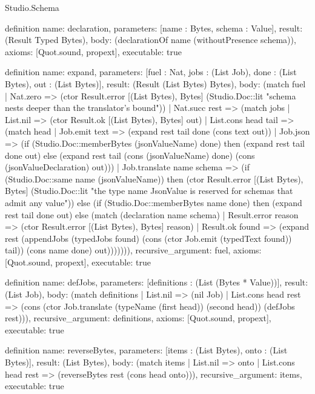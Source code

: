 \begin{lexlean}{Studio.Schema}
\begin{semanticmodule}
definition{
  name: declaration,
  parameters: [name : Bytes, schema : Value],
  result: (Result Typed Bytes),
  body: (declarationOf name (withoutPresence schema)),
  axioms: [Quot.sound, propext],
  executable: true
}

definition{
  name: expand,
  parameters: [fuel : Nat, jobs : (List Job), done : (List Bytes), out : (List Bytes)],
  result: (Result (List Bytes) Bytes),
  body: (match fuel
    | Nat.zero => (ctor Result.error [(List Bytes), Bytes] (Studio.Doc::lit "schema nests deeper than the translator's bound"))
    | Nat.succ rest => (match jobs
      | List.nil => (ctor Result.ok [(List Bytes), Bytes] out)
      | List.cons head tail => (match head
        | Job.emit text => (expand rest tail done (cons text out))
        | Job.json => (if (Studio.Doc::memberBytes (jsonValueName) done) then (expand rest tail done out) else (expand rest tail (cons (jsonValueName) done) (cons (jsonValueDeclaration) out)))
        | Job.translate name schema => (if (Studio.Doc::same name (jsonValueName)) then (ctor Result.error [(List Bytes), Bytes] (Studio.Doc::lit "the type name JsonValue is reserved for schemas that admit any value")) else (if (Studio.Doc::memberBytes name done) then (expand rest tail done out) else (match (declaration name schema)
          | Result.error reason => (ctor Result.error [(List Bytes), Bytes] reason)
          | Result.ok found => (expand rest (appendJobs (typedJobs found) (cons (ctor Job.emit (typedText found)) tail)) (cons name done) out))))))),
  recursive_argument: fuel,
  axioms: [Quot.sound, propext],
  executable: true
}

definition{
  name: defJobs,
  parameters: [definitions : (List (Bytes * Value))],
  result: (List Job),
  body: (match definitions
    | List.nil => (nil Job)
    | List.cons head rest => (cons (ctor Job.translate (typeName (first head)) (second head)) (defJobs rest))),
  recursive_argument: definitions,
  axioms: [Quot.sound, propext],
  executable: true
}

definition{
  name: reverseBytes,
  parameters: [items : (List Bytes), onto : (List Bytes)],
  result: (List Bytes),
  body: (match items
    | List.nil => onto
    | List.cons head rest => (reverseBytes rest (cons head onto))),
  recursive_argument: items,
  executable: true
}


\end{semanticmodule}
\end{lexlean}
